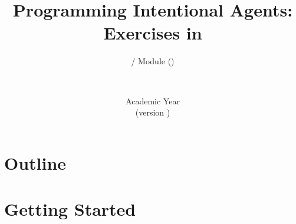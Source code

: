 \documentclass[presentation]{beamer}\mode<presentation>{\usetheme{AMSBolognaFC}}
\title[\currentLab{} -- \jason{}]{
    Programming Intentional Agents: Exercises in \jason{}
}
\subtitle{\courseName{} / Module \moduleN{} (\courseAcronym)}
\author[\sspeaker{\gcShort}]{\speaker{\gcFull} \\ \gcEmail}
\institute[\disiShort, \uniboShort]{\disi{} (\disiShort)\\\unibo}
\date[A.Y. \academicYear{} (v.\ \version)]{Academic Year \academicYear{}\\(version \version)}
\begin{document}

\frame{\titlepage}

\section*{Outline}
%
\frame[c]{\tableofcontents[hideallsubsections]}

\section{Getting Started}
\end{document}
